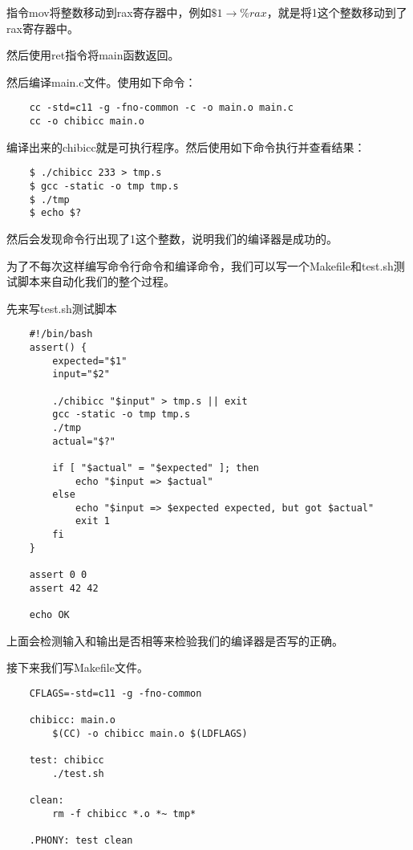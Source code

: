 \documentclass[cn,10pt,math=newtx,citestyle=gb7714-2015,bibstyle=gb7714-2015]{elegantbook}
\begin{document}
指令mov将整数移动到rax寄存器中，例如$\$1 \rightarrow \%rax$，就是将1这个整数移动到了rax寄存器中。

然后使用ret指令将main函数返回。

然后编译main.c文件。使用如下命令：

\begin{verbatim}
    cc -std=c11 -g -fno-common -c -o main.o main.c
    cc -o chibicc main.o
\end{verbatim}

编译出来的chibicc就是可执行程序。然后使用如下命令执行并查看结果：

\begin{verbatim}
    $ ./chibicc 233 > tmp.s
    $ gcc -static -o tmp tmp.s
    $ ./tmp
    $ echo $?
\end{verbatim}

然后会发现命令行出现了1这个整数，说明我们的编译器是成功的。

为了不每次这样编写命令行命令和编译命令，我们可以写一个Makefile和test.sh测试脚本来自动化我们的整个过程。

先来写test.sh测试脚本

\begin{verbatim}
    #!/bin/bash
    assert() {
        expected="$1"
        input="$2"

        ./chibicc "$input" > tmp.s || exit
        gcc -static -o tmp tmp.s
        ./tmp
        actual="$?"

        if [ "$actual" = "$expected" ]; then
            echo "$input => $actual"
        else
            echo "$input => $expected expected, but got $actual"
            exit 1
        fi
    }

    assert 0 0
    assert 42 42

    echo OK
\end{verbatim}

上面会检测输入和输出是否相等来检验我们的编译器是否写的正确。

接下来我们写Makefile文件。

\begin{verbatim}
    CFLAGS=-std=c11 -g -fno-common

    chibicc: main.o
        $(CC) -o chibicc main.o $(LDFLAGS)

    test: chibicc
        ./test.sh

    clean:
        rm -f chibicc *.o *~ tmp*

    .PHONY: test clean
\end{verbatim}
\end{document}
